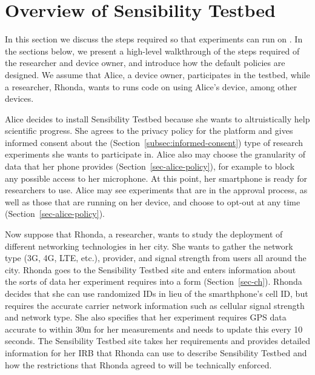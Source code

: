 \section{Overview of Sensibility Testbed}\label{sec-overview}

In this section we discuss the steps required so that experiments 
can run on \sysname. 
%
In the sections below, we present a high-level walkthrough of the steps 
required of the researcher and device owner, and 
introduce how the default policies are designed. 
We assume that Alice, a device owner, participates in 
the testbed, while a researcher, Rhonda, wants to runs code on \sysname 
using Alice's device, among other devices.


Alice decides to install Sensibility Testbed because she wants to 
altruistically help scientific progress.  She agrees to the privacy
policy for the platform and gives informed consent about the (Section~\ref{subsec:informed-consent})
type of research experiments she wants to participate in.  Alice also
may choose the granularity of data that her phone provides (Section~\ref{sec-alice-policy}), for 
example to block any possible access to her microphone.  At this point,
her smartphone is ready for researchers to use.  Alice may see experiments 
that are in the approval process, as
well as those that are running on her device, and choose
to opt-out at any time (Section~\ref{sec-alice-policy}). 

Now suppose that Rhonda, a researcher, wants to study the deployment of
different networking technologies in her city.  She wants to gather
the network type (3G, 4G, LTE, etc.), provider, and signal strength from
users all around the city.  Rhonda goes to the Sensibility Testbed site
and enters information about the sorts of data her experiment requires
into a form (Section~\ref{sec-ch}).  Rhonda decides that she can use randomized IDs in lieu 
of the smarthphone's cell ID, but requires the accurate carrier 
network information such as cellular signal strength and network type. 
She also specifies that her experiment requires GPS data accurate to within
30m for her measurements and needs to update this every 10 seconds.
The Sensibility Testbed site takes her requirements and provides detailed
information for her IRB that Rhonda can use to describe Sensibility
Testbed and how the restrictions that Rhonda agreed to will be technically
enforced.

